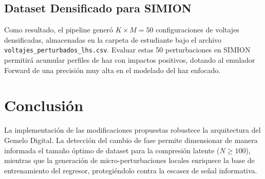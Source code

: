 \documentclass[12pt,letterpaper]{article}
\begin{document}
\subsection{Dataset Densificado para SIMION}
Como resultado, el pipeline generó $K \times M = 50$ configuraciones de voltajes densificadas, almacenadas en la carpeta de estudiante bajo el archivo \texttt{voltajes\_perturbados\_lhs.csv}. Evaluar estas 50 perturbaciones en SIMION permitirá acumular perfiles de haz con impactos positivos, dotando al emulador Forward de una precisión muy alta en el modelado del haz enfocado.

\section{Conclusión}
La implementación de las modificaciones propuestas robustece la arquitectura del Gemelo Digital. La detección del cambio de fase permite dimensionar de manera informada el tamaño óptimo de dataset para la compresión latente ($N \ge 100$), mientras que la generación de micro-perturbaciones locales enriquece la base de entrenamiento del regresor, protegiéndolo contra la escasez de señal informativa.
\end{document}
